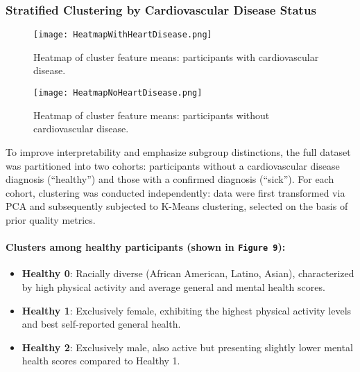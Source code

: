 \documentclass[12pt, a4paper]{article}
\begin{document}
\subsubsection{Stratified Clustering by Cardiovascular Disease Status}
\begin{figure}[htbp]
  \centering
	\begin{minipage}{0.48\textwidth}
	  \centering
	  \texttt{[image: HeatmapWithHeartDisease.png]}
	  \caption{Heatmap of cluster feature means: participants with cardiovascular disease.}
	  \label{fig:heatmap_stratified}
  \end{minipage}
  \hfill
  \begin{minipage}{0.48\textwidth}
    \centering
	  \texttt{[image: HeatmapNoHeartDisease.png]}
	  \caption{Heatmap of cluster feature means: participants without cardiovascular disease.}
	  \label{fig:heatmap_stratified}
  \end{minipage}
\end{figure}
To improve interpretability and emphasize subgroup distinctions, the full dataset was partitioned into two cohorts: participants without a cardiovascular disease diagnosis (“healthy”) and those with a confirmed diagnosis (“sick”). For each cohort, clustering was conducted independently: data were first transformed via PCA and subsequently subjected to K-Means clustering, selected on the basis of prior quality metrics. 

\paragraph{Clusters among healthy participants  (shown in \texttt{Figure 9}):}
\begin{itemize}
  \item \textbf{Healthy 0}: Racially diverse (African American, Latino, Asian), characterized by high physical activity and average general and mental health scores.
  \item \textbf{Healthy 1}: Exclusively female, exhibiting the highest physical activity levels and best self-reported general health.
  \item \textbf{Healthy 2}: Exclusively male, also active but presenting slightly lower mental health scores compared to Healthy 1.
\end{itemize}
\end{document}

